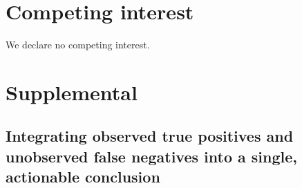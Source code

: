 \section*{Competing interest}
\noindent
We declare no competing interest. 




\clearpage
\beginsupplement
\section{Supplemental} \label{Supplemental_text}

\subsection{Integrating observed true positives and unobserved false negatives into a single, actionable conclusion}





